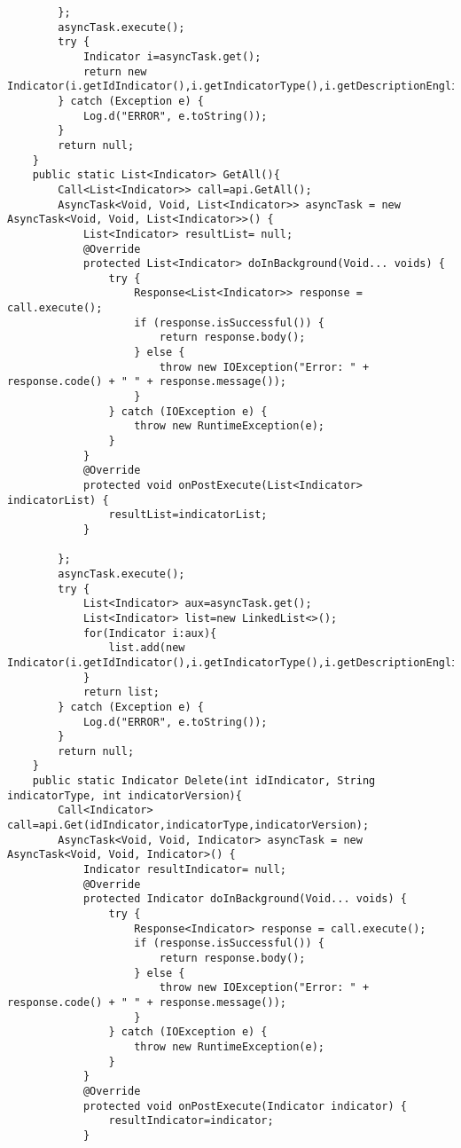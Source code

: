 \begin{itemize}
\begin{itemize}
\begin{lstlisting}
        };
        asyncTask.execute();
        try {
            Indicator i=asyncTask.get();
            return new Indicator(i.getIdIndicator(),i.getIndicatorType(),i.getDescriptionEnglish(),i.getDescriptionSpanish(),i.getDescriptionFrench(),i.getPriority(),i.getIndicatorVersion());
        } catch (Exception e) {
            Log.d("ERROR", e.toString());
        }
        return null;
    }
    public static List<Indicator> GetAll(){
        Call<List<Indicator>> call=api.GetAll();
        AsyncTask<Void, Void, List<Indicator>> asyncTask = new AsyncTask<Void, Void, List<Indicator>>() {
            List<Indicator> resultList= null;
            @Override
            protected List<Indicator> doInBackground(Void... voids) {
                try {
                    Response<List<Indicator>> response = call.execute();
                    if (response.isSuccessful()) {
                        return response.body();
                    } else {
                        throw new IOException("Error: " + response.code() + " " + response.message());
                    }
                } catch (IOException e) {
                    throw new RuntimeException(e);
                }
            }
            @Override
            protected void onPostExecute(List<Indicator> indicatorList) {
                resultList=indicatorList;
            }

        };
        asyncTask.execute();
        try {
            List<Indicator> aux=asyncTask.get();
            List<Indicator> list=new LinkedList<>();
            for(Indicator i:aux){
                list.add(new Indicator(i.getIdIndicator(),i.getIndicatorType(),i.getDescriptionEnglish(),i.getDescriptionSpanish(),i.getDescriptionFrench(),i.getPriority(),i.getIndicatorVersion()));
            }
            return list;
        } catch (Exception e) {
            Log.d("ERROR", e.toString());
        }
        return null;
    }
    public static Indicator Delete(int idIndicator, String indicatorType, int indicatorVersion){
        Call<Indicator> call=api.Get(idIndicator,indicatorType,indicatorVersion);
        AsyncTask<Void, Void, Indicator> asyncTask = new AsyncTask<Void, Void, Indicator>() {
            Indicator resultIndicator= null;
            @Override
            protected Indicator doInBackground(Void... voids) {
                try {
                    Response<Indicator> response = call.execute();
                    if (response.isSuccessful()) {
                        return response.body();
                    } else {
                        throw new IOException("Error: " + response.code() + " " + response.message());
                    }
                } catch (IOException e) {
                    throw new RuntimeException(e);
                }
            }
            @Override
            protected void onPostExecute(Indicator indicator) {
                resultIndicator=indicator;
            }


\end{lstlisting}
\end{itemize}
\end{itemize}
